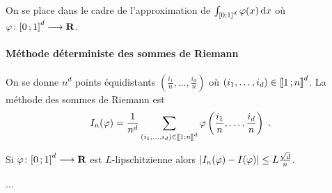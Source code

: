 	On se place dans le cadre de l'approximation de $\int_{\mathopen{[}0\mathclose{}\mathpunct{};1\mathclose{]}^d} \varphi(x) \mathop{}\mathopen{}\mathrm{d} x$ où $\varphi \colon \mathopen{[}0\mathclose{}\mathpunct{};1\mathclose{]}^d \longrightarrow \mathbf{R}$.

	\paragraph{Méthode déterministe des sommes de Riemann}

	On se donne $n^d$ points équidistants $\left( \frac{i_1}{n},\ldots,\frac{i_d}{n} \right)$ où $(i_1,\ldots,i_d) \in \mathopen{}\mathclose{\left[\![1\mathclose{}\mathpunct{};n\right]\!]}^d$.
	La méthode des sommes de Riemann est
	$$I_n(\varphi) = \frac{1}{n^d} \sum_{(i_1,\ldots,i_d) \in \mathopen{}\mathclose{\left[\![1\mathclose{}\mathpunct{};n\right]\!]}^d} \varphi \left( \frac{i_1}{n},\ldots,\frac{i_d}{n} \right)\ .$$

	\begin{pop}
		Si $\varphi \colon \mathopen{[}0\mathclose{}\mathpunct{};1\mathclose{]}^d \longrightarrow \mathbf{R}$ est $L$-lipschitzienne alors $\left\lvert I_n(\varphi) - I(\varphi)\right\rvert \leq L \frac{\sqrt{d}}{n}$.
	\end{pop}

	...

	